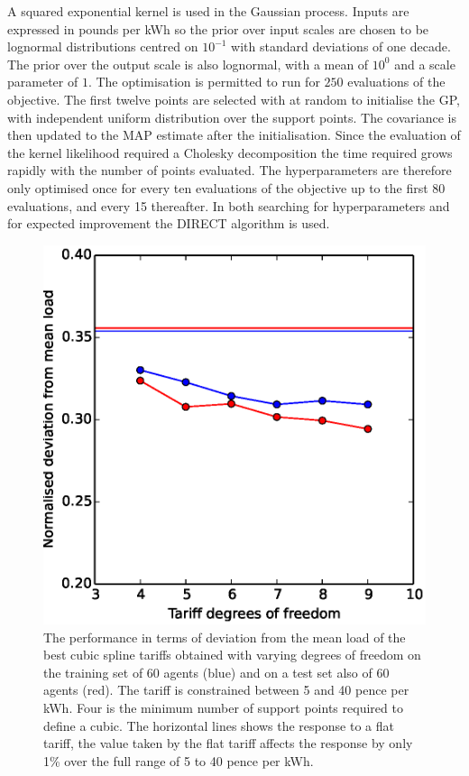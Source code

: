 \documentclass[a4paper, 10 pt, conference]{ieeeconf}  %
\begin{document}
A squared exponential kernel is used in the Gaussian process. Inputs are expressed in pounds per kWh so the  prior over input scales are chosen to be lognormal distributions centred on $10^{-1}$ with standard deviations of one decade. The prior over the output scale is also lognormal, with a mean of $10^0$ and a scale parameter of $1$. The optimisation is permitted to run for $250$ evaluations of the objective. The first twelve points are selected with at random to initialise the GP, with independent uniform distribution over the support points. The covariance is then updated to the MAP estimate after the initialisation. Since the evaluation of the kernel likelihood required a Cholesky decomposition the time required grows rapidly with the number of points evaluated. The hyperparameters are therefore only optimised once for every ten evaluations of the objective up to the first 80 evaluations, and every 15 thereafter. In both searching for hyperparameters and for expected improvement the DIRECT algorithm is used.

\begin{figure}[htb]
\centering
\includegraphics[width=\columnwidth,trim =0cm 0cm 0cm 0cm,clip=True]{f2.eps}
\caption{The performance in terms of deviation from the mean load of the best cubic spline tariffs obtained with varying degrees of freedom on the training set of 60 agents (blue) and on a test set also of 60 agents (red). The tariff is constrained between 5 and 40 pence per kWh. Four is the minimum number of support points required to define a cubic. The horizontal lines shows the response to a flat tariff, the value taken by the flat tariff affects the response by only 1\% over the full range of 5 to 40 pence per kWh.}
\label{DOFplot}
\end{figure}
\end{document}
